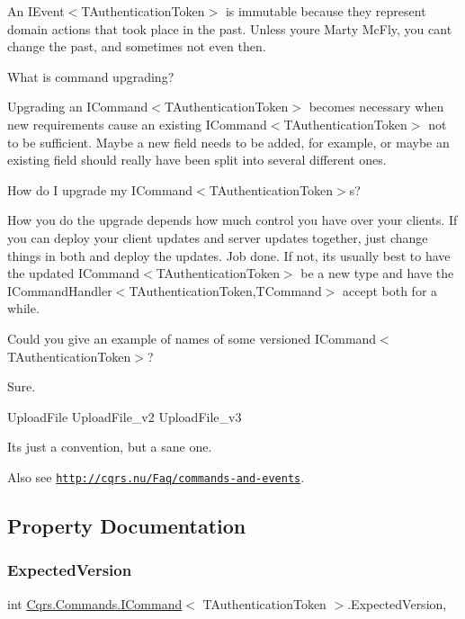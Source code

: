 An I\+Event$<$\+T\+Authentication\+Token$>$ is immutable because they represent domain actions that took place in the past. Unless you\textquotesingle{}re Marty Mc\+Fly, you can\textquotesingle{}t change the past, and sometimes not even then.

What is command upgrading?

Upgrading an I\+Command$<$\+T\+Authentication\+Token$>$ becomes necessary when new requirements cause an existing I\+Command$<$\+T\+Authentication\+Token$>$ not to be sufficient. Maybe a new field needs to be added, for example, or maybe an existing field should really have been split into several different ones.

How do I upgrade my I\+Command$<$\+T\+Authentication\+Token$>$s?

How you do the upgrade depends how much control you have over your clients. If you can deploy your client updates and server updates together, just change things in both and deploy the updates. Job done. If not, it\textquotesingle{}s usually best to have the updated I\+Command$<$\+T\+Authentication\+Token$>$ be a new type and have the I\+Command\+Handler$<$\+T\+Authentication\+Token,\+T\+Command$>$ accept both for a while.

Could you give an example of names of some versioned I\+Command$<$\+T\+Authentication\+Token$>$?

Sure.

Upload\+File Upload\+File\+\_\+v2 Upload\+File\+\_\+v3

It\textquotesingle{}s just a convention, but a sane one. 

 Also see \href{http://cqrs.nu/Faq/commands-and-events}{\tt http\+://cqrs.\+nu/\+Faq/commands-\/and-\/events}. 

\subsection{Property Documentation}
\mbox{\label{interfaceCqrs_1_1Commands_1_1ICommand_a8b207da81f36bd4426e83e2ec948eb49_a8b207da81f36bd4426e83e2ec948eb49}} 
\subsubsection{\texorpdfstring{Expected\+Version}{ExpectedVersion}}
{\footnotesize\ttfamily int \hyperlink{interfaceCqrs_1_1Commands_1_1ICommand}{Cqrs.\+Commands.\+I\+Command}$<$ T\+Authentication\+Token $>$.Expected\+Version\hspace{0.3cm}{\ttfamily [get]}, {\ttfamily [set]}}

